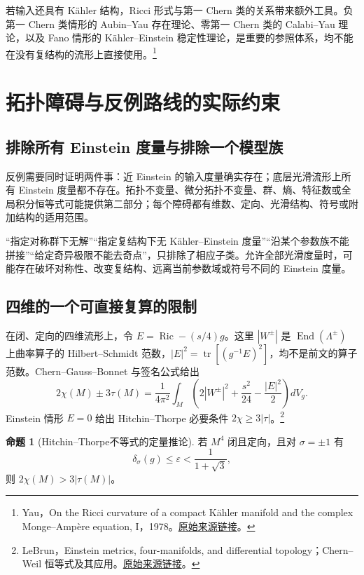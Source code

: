 \documentclass[11pt,a4paper]{article}
\theoremstyle{definition}
\newtheorem{proposition}[definition]{命题}
\newcommand{\Ric}{\operatorname{Ric}}
\newcommand{\tr}{\operatorname{tr}}
\newcommand{\src}[3]{\footnote{\raggedright #1，#2。\href{#3}{原始来源链接}。}}
\begin{document}
若输入还具有 Kähler 结构，Ricci 形式与第一 Chern 类的关系带来额外工具。负第一 Chern 类情形的 Aubin--Yau 存在理论、零第一 Chern 类的 Calabi--Yau 理论，以及 Fano 情形的 Kähler--Einstein 稳定性理论，是重要的参照体系，均不能在没有复结构的流形上直接使用。\src{Yau}{On the Ricci curvature of a compact Kähler manifold and the complex Monge--Ampère equation, I，1978}{https://doi.org/10.1002/cpa.3160310304}

\section{拓扑障碍与反例路线的实际约束}\label{sec:obstruction}

\subsection{排除所有 Einstein 度量与排除一个模型族}

反例需要同时证明两件事：近 Einstein 的输入度量确实存在；底层光滑流形上所有 Einstein 度量都不存在。拓扑不变量、微分拓扑不变量、群、熵、特征数或全局积分恒等式可能提供第二部分；每个障碍都有维数、定向、光滑结构、符号或附加结构的适用范围。

“指定对称群下无解”“指定复结构下无 Kähler--Einstein 度量”“沿某个参数族不能拼接”“给定奇异极限不能去奇点”，只排除了相应子类。允许全部光滑度量时，可能存在破坏对称性、改变复结构、远离当前参数域或符号不同的 Einstein 度量。

\subsection{四维的一个可直接复算的限制}

在闭、定向的四维流形上，令 $E=\Ric-(s/4)g$。这里 $|W^\pm|$ 是 $\operatorname{End}(\Lambda^\pm)$ 上曲率算子的 Hilbert--Schmidt 范数，$|E|^2=\tr[(g^{-1}E)^2]$，均不是前文的算子范数。Chern--Gauss--Bonnet 与签名公式给出
\begin{equation}\label{eq:GB}
2\chi(M)\pm3\tau(M)=\frac1{4\pi^2}\int_M
\left(2|W^\pm|^2+\frac{s^2}{24}-\frac{|E|^2}{2}\right)dV_g.
\end{equation}
Einstein 情形 $E=0$ 给出 Hitchin--Thorpe 必要条件 $2\chi\ge3|\tau|$。\src{LeBrun}{Einstein metrics, four-manifolds, and differential topology；Chern--Weil 恒等式及其应用}{https://arxiv.org/abs/math/0404359}

\begin{proposition}[Hitchin--Thorpe不等式的定量推论]\label{prop:gap}
若 $M^4$ 闭且定向，且对 $\sigma=\pm1$ 有
\[
\delta_\sigma(g)\le\varepsilon<\frac{1}{1+\sqrt3},
\]
则 $2\chi(M)>3|\tau(M)|$。
\end{proposition}
\end{document}
